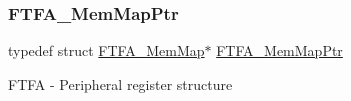 \subsubsection{\texorpdfstring{F\+T\+F\+A\+\_\+\+Mem\+Map\+Ptr}{FTFA\_MemMapPtr}}
{\footnotesize\ttfamily typedef struct \hyperlink{struct_f_t_f_a___mem_map}{F\+T\+F\+A\+\_\+\+Mem\+Map}$\ast$ \hyperlink{group___f_t_f_a___peripheral_ga49d048bbeb55a090a5ecfe86ff767884}{F\+T\+F\+A\+\_\+\+Mem\+Map\+Ptr}}

F\+T\+FA -\/ Peripheral register structure 